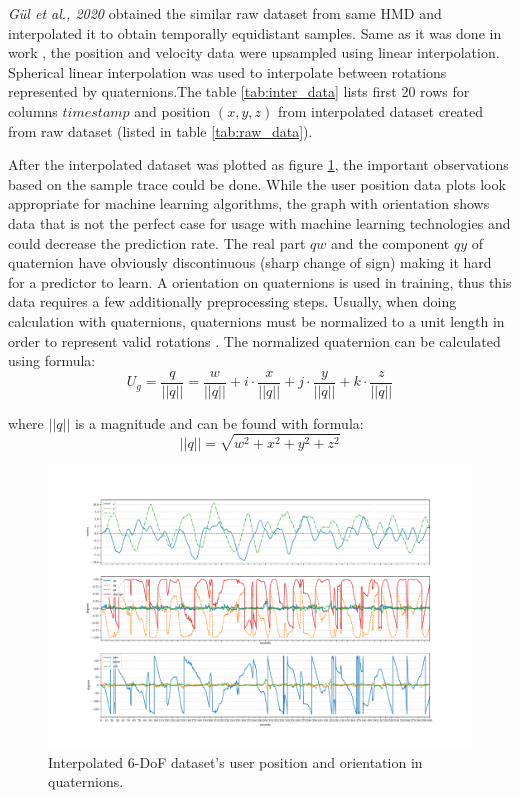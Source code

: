 \textit{Gül et al., 2020} obtained the similar raw dataset from same HMD and interpolated it to obtain temporally equidistant samples. Same as it was done in work \cite{serhan_kalman}, the position and velocity data were upsampled using linear interpolation. Spherical linear interpolation was used to interpolate between rotations represented by quaternions.The table \ref{tab:inter_data} lists first 20 rows for columns $timestamp$ and position $(x, y, z)$ from interpolated dataset created from raw dataset (listed in table \ref{tab:raw_data}). 

After the interpolated dataset was plotted as figure \ref{fig:inter_data}, the important observations based on the sample trace could be done. While the user position data plots look appropriate for machine learning algorithms, the graph with orientation shows data that is not the perfect case for usage with machine learning technologies and could decrease the prediction rate. The real part $qw$ and the component $qy$ of quaternion have obviously discontinuous (sharp change of sign) making it hard for a predictor to learn. A orientation on quaternions is used in training, thus this data requires a few additionally preprocessing steps. Usually, when doing calculation with quaternions, quaternions must be normalized to a unit length in order to represent valid rotations \cite{principles_robot_motion_book}. The normalized quaternion can be calculated using formula:
\begin{equation}
U_g = \frac{q}{|| q ||} = \frac{w}{|| q ||} + i \cdot \frac{x}{|| q ||} + j \cdot \frac{y}{|| q ||} + k \cdot \frac{z}{|| q ||}
\end{equation}

where $|| q || $ is a magnitude and can be found with formula:
\begin{equation}
|| q || = \sqrt{w^2 + x^2 + y^2 + z^2 }
\end{equation}

\begin{figure}[htb]
	\begin{center}
		\includegraphics[width=1\textwidth, keepaspectratio]{gfx/Fig-1556-interpolated_2.pdf}
		\caption{\label{fig:inter_data}Interpolated 6-DoF dataset's user position and orientation in quaternions.}
	\end{center}
\end{figure}

